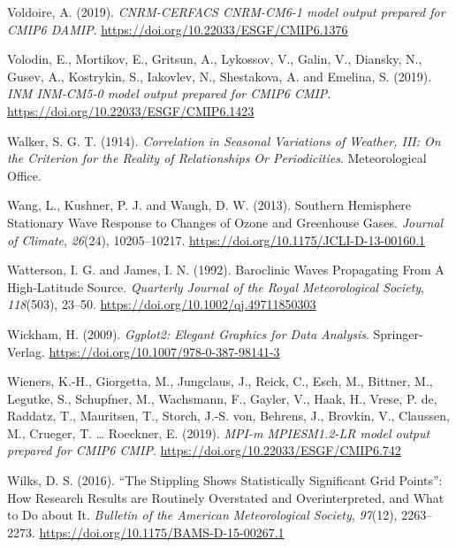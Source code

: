 \documentclass[12pt,oneside,a4paper]{reedthesis}
\newlength{\cslhangindent}
\newenvironment{CSLReferences}[2] %
 {%
  \setlength{\parindent}{0pt}
  \ifodd #1 \everypar{\setlength{\hangindent}{\cslhangindent}}\ignorespaces\fi
  \ifnum #2 > 0
  \setlength{\parskip}{#2\baselineskip}
  \fi
 }%
 {}
\begin{document}
\begin{CSLReferences}{1}{0}
\leavevmode{}%
Voldoire, A. (2019). \emph{CNRM-CERFACS CNRM-CM6-1 model output prepared for CMIP6 DAMIP}. \url{https://doi.org/10.22033/ESGF/CMIP6.1376}

\leavevmode{}%
Volodin, E., Mortikov, E., Gritsun, A., Lykossov, V., Galin, V., Diansky, N., Gusev, A., Kostrykin, S., Iakovlev, N., Shestakova, A. and Emelina, S. (2019). \emph{INM INM-CM5-0 model output prepared for CMIP6 CMIP}. \url{https://doi.org/10.22033/ESGF/CMIP6.1423}

\leavevmode{}%
Walker, S. G. T. (1914). \emph{Correlation in {Seasonal Variations} of {Weather}, {III}: {On} the {Criterion} for the {Reality} of {Relationships Or Periodicities}}. {Meteorological Office}.

\leavevmode{}%
Wang, L., Kushner, P. J. and Waugh, D. W. (2013). Southern {Hemisphere Stationary Wave Response} to {Changes} of {Ozone} and {Greenhouse Gases}. \emph{Journal of Climate}, \emph{26}(24), 10205--10217. \url{https://doi.org/10.1175/JCLI-D-13-00160.1}

\leavevmode{}%
Watterson, I. G. and James, I. N. (1992). Baroclinic {Waves Propagating From A High-Latitude Source}. \emph{Quarterly Journal of the Royal Meteorological Society}, \emph{118}(503), 23--50. \url{https://doi.org/10.1002/qj.49711850303}

\leavevmode{}%
Wickham, H. (2009). \emph{Ggplot2: {Elegant Graphics} for {Data Analysis}}. {Springer-Verlag}. \url{https://doi.org/10.1007/978-0-387-98141-3}

\leavevmode{}%
Wieners, K.-H., Giorgetta, M., Jungclaus, J., Reick, C., Esch, M., Bittner, M., Legutke, S., Schupfner, M., Wachsmann, F., Gayler, V., Haak, H., Vrese, P. de, Raddatz, T., Mauritsen, T., Storch, J.-S. von, Behrens, J., Brovkin, V., Claussen, M., Crueger, T. \ldots{} Roeckner, E. (2019). \emph{MPI-m MPIESM1.2-LR model output prepared for CMIP6 CMIP}. \url{https://doi.org/10.22033/ESGF/CMIP6.742}

\leavevmode{}%
Wilks, D. S. (2016). {``{The Stippling Shows Statistically Significant Grid Points}''}: {How Research Results} are {Routinely Overstated} and {Overinterpreted}, and {What} to {Do} about {It}. \emph{Bulletin of the American Meteorological Society}, \emph{97}(12), 2263--2273. \url{https://doi.org/10.1175/BAMS-D-15-00267.1}


\end{CSLReferences}
\end{document}
